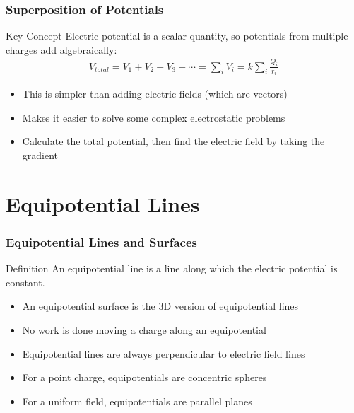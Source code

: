 \documentclass{beamer}
\begin{document}
\begin{frame}
    \frametitle{Superposition of Potentials}
    
    \begin{block}{Key Concept}
        Electric potential is a scalar quantity, so potentials from multiple charges add algebraically:
        \begin{align}
            V_{total} = V_1 + V_2 + V_3 + \cdots = \sum_i V_i = k\sum_i \frac{Q_i}{r_i}
        \end{align}
    \end{block}
    
    \begin{itemize}
        \item This is simpler than adding electric fields (which are vectors)
        \item Makes it easier to solve some complex electrostatic problems
        \item Calculate the total potential, then find the electric field by taking the gradient
    \end{itemize}
\end{frame}

\section{Equipotential Lines}

\begin{frame}
    \frametitle{Equipotential Lines and Surfaces}
    
    \begin{block}{Definition}
        An equipotential line is a line along which the electric potential is constant.
    \end{block}
    
    \begin{itemize}
        \item An equipotential surface is the 3D version of equipotential lines
        \item No work is done moving a charge along an equipotential
        \item Equipotential lines are always perpendicular to electric field lines
        \item For a point charge, equipotentials are concentric spheres
        \item For a uniform field, equipotentials are parallel planes
    \end{itemize}
\end{frame}
\end{document}

